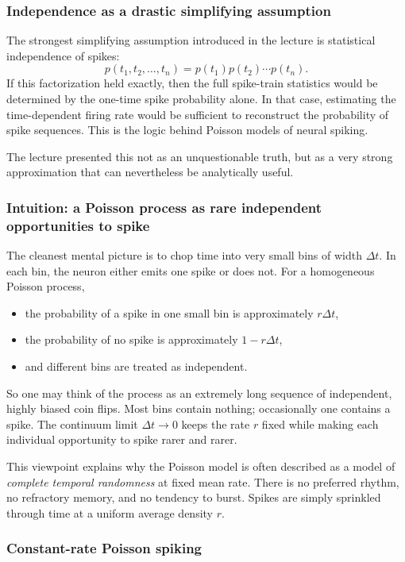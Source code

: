 \documentclass[11pt]{article}
\begin{document}
\subsubsection{Independence as a drastic simplifying assumption}

The strongest simplifying assumption introduced in the lecture is statistical independence of spikes:
\[
p(t_1,t_2,\dots,t_n)=p(t_1)p(t_2)\cdots p(t_n).
\]
If this factorization held exactly, then the full spike-train statistics would be determined by the one-time spike probability alone. In that case, estimating the time-dependent firing rate would be sufficient to reconstruct the probability of spike sequences. This is the logic behind Poisson models of neural spiking.

The lecture presented this not as an unquestionable truth, but as a very strong approximation that can nevertheless be analytically useful.

\subsubsection{Intuition: a Poisson process as rare independent opportunities to spike}

The cleanest mental picture is to chop time into very small bins of width $\Delta t$. In each bin, the neuron either emits one spike or does not. For a homogeneous Poisson process,
\begin{itemize}
    \item the probability of a spike in one small bin is approximately $r\Delta t$,
    \item the probability of no spike is approximately $1-r\Delta t$,
    \item and different bins are treated as independent.
\end{itemize}
So one may think of the process as an extremely long sequence of independent, highly biased coin flips. Most bins contain nothing; occasionally one contains a spike. The continuum limit $\Delta t\to 0$ keeps the rate $r$ fixed while making each individual opportunity to spike rarer and rarer.

This viewpoint explains why the Poisson model is often described as a model of \emph{complete temporal randomness} at fixed mean rate. There is no preferred rhythm, no refractory memory, and no tendency to burst. Spikes are simply sprinkled through time at a uniform average density $r$.

\subsubsection{Constant-rate Poisson spiking}
\end{document}
